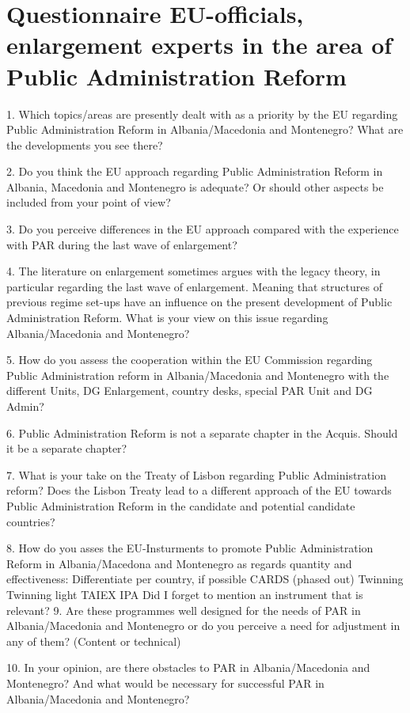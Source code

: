 \pagestyle{empty}
\chapter{Questionnaire EU-officials, enlargement experts in the area of Public Administration Reform }
\label{anhang:Questionnaire EU-officials}
1. Which topics/areas are presently dealt with as a priority by the EU regarding Public Administration Reform in Albania/Macedonia and Montenegro? What are the developments you see there?

2. Do you think the EU approach regarding Public Administration Reform in Albania, Macedonia and Montenegro is adequate? Or should other aspects be included from your point of view?

3. Do you perceive differences in the EU approach compared with the experience with PAR during the last wave of enlargement?

4. The literature on enlargement sometimes argues with the legacy theory, in particular regarding the last wave of enlargement. Meaning that structures of previous regime set-ups have an influence on the present development of Public Administration Reform. What is your view on this issue regarding Albania/Macedonia and Montenegro?

5. How do you assess the cooperation within the EU Commission regarding Public Administration reform in Albania/Macedonia and Montenegro with the different Units, DG Enlargement, country desks, special PAR Unit and DG Admin? 

6. Public Administration Reform is not a separate chapter in the Acquis. Should it be a separate chapter? 

7. What is your take on the Treaty of Lisbon regarding Public Administration reform? Does the Lisbon Treaty lead to a different approach of the EU towards Public Administration Reform in the candidate and potential candidate countries? 

8. How do you asses the EU-Insturments to promote Public Administration Reform in Albania/Macedona and Montenegro as regards quantity and effectiveness:
Differentiate per country, if possible
CARDS (phased out)
Twinning
Twinning light
TAIEX
IPA
Did I forget to mention an instrument that is relevant?
9. Are these programmes well designed for the needs of PAR in Albania/Macedonia and Montenegro or do you perceive a need for adjustment in any of them? (Content or technical)


10. In your opinion, are there obstacles to PAR in Albania/Macedonia and Montenegro? And what would be necessary for successful PAR in Albania/Macedonia and Montenegro? 


